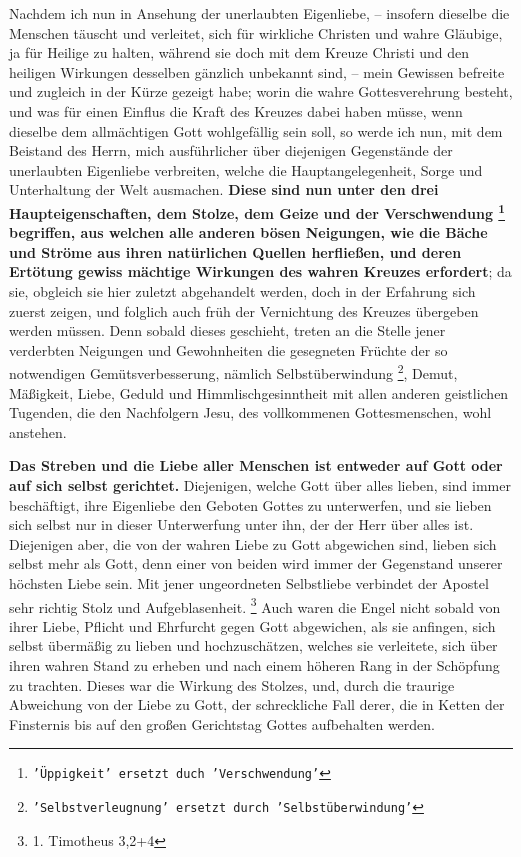 Nachdem ich nun in Ansehung der unerlaubten Eigenliebe, -- insofern dieselbe die
Menschen täuscht und verleitet, sich für wirkliche Christen und wahre Gläubige,
ja für Heilige zu halten, während sie doch mit dem Kreuze Christi und den
heiligen Wirkungen desselben gänzlich unbekannt sind, -- mein Gewissen befreite
und zugleich in der Kürze gezeigt habe; 
worin die wahre Gottesverehrung
besteht, und was für einen Einflus die Kraft des Kreuzes dabei haben müsse,
wenn dieselbe dem allmächtigen Gott wohlgefällig sein soll, so werde ich nun,
mit dem Beistand des Herrn, mich ausführlicher über diejenigen Gegenstände der
unerlaubten Eigenliebe  verbreiten, welche die
Hauptangelegenheit, Sorge und
Unterhaltung der Welt ausmachen. \textbf{Diese sind nun unter den drei
Haupteigenschaften, dem Stolze, dem Geize und der
Verschwendung
\footnote{\texttt{'Üppigkeit' ersetzt duch 'Verschwendung'}}
 begriffen, aus
welchen alle anderen bösen Neigungen, wie die Bäche und Ströme aus ihren
natürlichen Quellen herfließen, und deren Ertötung gewiss mächtige Wirkungen
des wahren Kreuzes erfordert}; da sie, obgleich sie hier zuletzt abgehandelt
werden, doch in der Erfahrung sich zuerst zeigen, und folglich auch früh der
Vernichtung des Kreuzes übergeben werden müssen. Denn sobald dieses geschieht,
treten an die Stelle jener verderbten Neigungen und Gewohnheiten die gesegneten
Früchte der so notwendigen Gemütsverbesserung, nämlich Selbstüberwindung
\footnote{\texttt{'Selbstverleugnung' ersetzt durch 'Selbstüberwindung'}},
Demut, Mäßigkeit, Liebe,
Geduld und Himmlischgesinntheit mit allen anderen
geistlichen Tugenden, die den Nachfolgern Jesu, des vollkommenen
Gottesmenschen,
wohl anstehen.

\medskip

\textbf{Das Streben und die Liebe aller Menschen ist
entweder auf Gott oder auf sich
selbst gerichtet.} Diejenigen, welche Gott über alles lieben, sind immer
beschäftigt, ihre Eigenliebe den Geboten Gottes zu unterwerfen, und sie lieben
sich selbst nur in dieser Unterwerfung unter ihn, der der Herr über alles ist.
Diejenigen aber, die von der wahren Liebe zu Gott abgewichen sind, lieben sich
selbst mehr als Gott, denn einer von beiden wird immer der Gegenstand unserer
höchsten Liebe sein. Mit jener ungeordneten Selbstliebe verbindet der Apostel
sehr richtig Stolz und Aufgeblasenheit.
\footnote{1. Timotheus 3,2+4}
Auch waren die
Engel nicht sobald von ihrer Liebe,
Pflicht und Ehrfurcht gegen Gott abgewichen,
als sie anfingen, sich selbst übermäßig zu lieben und hochzuschätzen, welches
sie verleitete, sich über ihren wahren Stand zu erheben und nach einem höheren
Rang in der Schöpfung zu trachten. Dieses war die Wirkung
des Stolzes, und,
durch die traurige Abweichung von der Liebe zu Gott, der schreckliche Fall
derer, die in Ketten der Finsternis bis auf den großen Gerichtstag
Gottes
aufbehalten werden.

